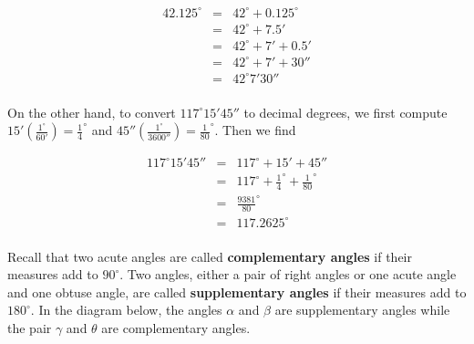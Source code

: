 \documentclass[12pt]{ximera}
\begin{document}
\[ \begin{array}{rcl}

42.125^{\circ} & = &  42^{\circ} + 0.125^{\circ} \\
               & = & 42^{\circ} + 7.5' \\
               & = & 42^{\circ} + 7' + 0.5' \\
               & = & 42^{\circ} + 7' + 30'' \\
               & = & 42^{\circ} 7' 30'' \\ \end{array} \]
      
On the other hand, to convert $117^{\circ}15'45''$ to decimal degrees, we first compute $15' \left(\frac{1^{\circ}}{60'}\right) = \frac{1}{4}^{\circ}$ and $45'' \left(\frac{1^{\circ}}{3600''}\right) = \frac{1}{80}^{\circ}$. Then we find

\[ \begin{array}{rcl}

 117^{\circ}15'45'' & = & 117^{\circ} + 15' + 45'' \\ [5pt]
                    & = & 117^{\circ} + \frac{1}{4}^{\circ} + \frac{1}{80}^{\circ} \\ [5pt]
                    & = & \frac{9381}{80}^{\circ} \\ [5pt]
                    & = &  117.2625^{\circ} \\ \end{array} \]

Recall that two acute angles are called \textbf{complementary angles} if their measures add to $90^{\circ}$.  Two angles, either a pair of right angles or one acute angle and one obtuse angle, are called \textbf{supplementary angles} if their measures add to $180^{\circ}$. In the diagram below,  the angles $\alpha$ and $\beta$ are supplementary angles while the pair $\gamma$ and $\theta$ are complementary angles. 
\end{document}
